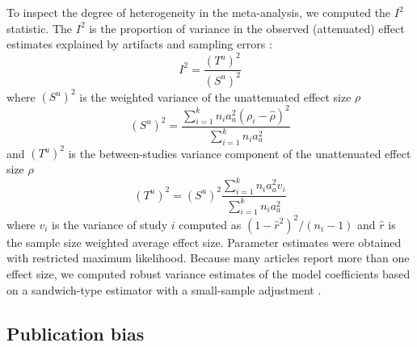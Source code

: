 To inspect the degree of heterogeneity in the meta-analysis, we computed the $I^2$ statistic. The $I^2$ is the proportion of variance in the observed (attenuated) effect estimates explained by artifacts and sampling errors \citep{borenstein2011introduction}: 
%
\begin{equation}
\label{eq:i2_statistic}
I^2 = \frac{(T^u)^2}{(S^u)^2}
\end{equation}
%
where $(S^u)^2$ is the weighted variance of the unattenuated effect size $\rho$
%
\begin{equation}
\label{eq:Su2_var}
(S^u)^2 = \frac{\sum_{i=1}^k n_i a_a^2 (\rho_i - \hat{\rho})^2}{\sum_{i=1}^k n_i a_a^2}
\end{equation}
%
and $(T^u)^2$ is the between-studies variance component of the unattenuated effect size $\rho$
%
\begin{equation}
\label{eq:Tu2_var}
(T^u)^2 = (S^u)^2 \frac{\sum_{i=1}^k n_i a_a^2 v_i}{\sum_{i=1}^k n_i a_a^2}
\end{equation}
%
where $v_i$ is the variance of study $i$ computed as $(1 - \hat{r}^2)^2 / (n_i - 1)$ and $\hat{r}$ is the sample size weighted average effect size. Parameter estimates were obtained with restricted maximum likelihood. Because many articles report more than one effect size, we computed robust variance estimates of the model coefficients based on a sandwich-type estimator with a small-sample adjustment \citep{hedges2010}.


\subsection{Publication bias}

